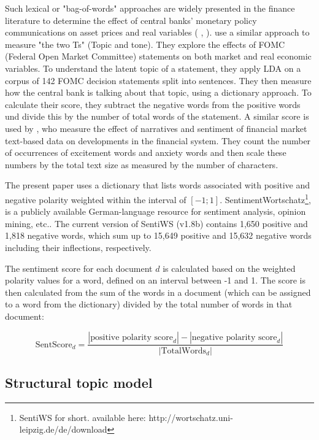 \documentclass[12pt,a4paper,notitlepage]{article}
\begin{document}
Such lexical or "bag-of-words" approaches are widely presented in the finance literature to determine the effect of central banks' monetary policy communications on asset prices and real variables (\citet{nyman_news_2018} \citet{tetlock_giving_2007}, \citet{tetlock_more_2008}). \citet{hansen_shocking_2016} use a similar approach to measure "the two Ts" (Topic and tone). They explore the effects of FOMC (Federal Open Market Committee) statements on both market and real economic variables. To understand the latent topic of a statement, they apply LDA on a corpus of 142 FOMC decision statements split into sentences. They then measure how the central bank is talking about that topic, using a dictionary approach. To calculate their score, they subtract the negative words from the positive words und divide this by the number of total words of the statement. A similar score is used by \citet{nyman_news_2018}, who measure the effect of narratives and sentiment of financial market text-based data on developments in the financial system. They count the number of occurrences of excitement words and anxiety words and then scale these numbers by the total text size as measured by the number of characters.

The present paper uses a dictionary that lists words associated with positive and negative polarity weighted within the interval of $[-1; 1]$. SentimentWortschatz\footnote{SentiWS for short. available here: http://wortschatz.uni-leipzig.de/de/download}, is a publicly available German-language resource for sentiment analysis, opinion mining, etc.. The current version of SentiWS (v1.8b) contains 1,650 positive and 1,818 negative words, which sum up to 15,649 positive and 15,632 negative words including their inflections, respectively. 

The sentiment score for each document $d$ is calculated  based on the weighted polarity values for a word, defined on an interval between -1 and 1. The score is then calculated from the sum of the words in a document (which can be assigned to a word from the dictionary) divided by the total number of words in that document:
 
\begin{equation}
	\text{SentScore}_d = \frac{|\text{positive polarity score}_d| - |\text{negative polarity score}_d|}{|\text{TotalWords}_d|}
\end{equation}

\subsection{Structural topic model}\label{ch_stm}
\end{document}
